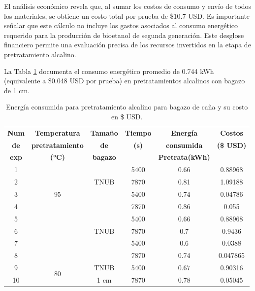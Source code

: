 \documentclass[12pt]{article}
\begin{document}
	El análisis económico revela que, al sumar los costos de consumo y envío de todos los materiales, se obtiene un costo total por prueba de \$10.7 USD. Es importante señalar que este cálculo no incluye los gastos asociados al consumo energético requerido para la producción de bioetanol de segunda generación. Este desglose financiero permite una evaluación precisa de los recursos invertidos en la etapa de pretratamiento alcalino.
	
	La Tabla \ref{tabla costo 1 cm} documenta el consumo energético promedio de 0.744 kWh (equivalente a \$0.048 USD por prueba) en pretratamientos alcalinos con bagazo de 1 cm.
	
	
	
	\begin{table}[H]
		\centering
		\caption{Energía consumida para pretratamiento alcalino para bagazo de caña y su costo en \$ USD. }
		\label{tabla costo 1 cm}
		\setlength{\tabcolsep}{2.5pt}
			\begin{tabular}{|c|c|c|c|c|c|}
				\hline
				\textbf{Num}&\textbf{Temperatura } & \textbf{Tamaño } & \textbf{Tiempo} & \textbf{Energía} & \textbf{Costos } \\ 
			\textbf{ de}	&\textbf{pretratamiento } &	\textbf{ de}  &	\textbf{ (s)} & 	\textbf{ consumida }& 	\textbf{(\$ USD)} \\ 
			\textbf{exp}	&\textbf{(°C)} &	\textbf{ bagazo}  &	 & 	\textbf{ Pretrata(kWh) }& 	 \\ \hline
			
			
			1&	\multirow{5}{*}{95} & \multirow{3}{*}{TNUB} & 5400 &0.66  & 0.88968  \\  \cline{4-6} \cline{1-1}
			2&                     	&                       & 7870 &0.81 & 1.09188  \\ \cline{3-6} \cline{1-1}
			3&                     	& \multirow{3}{*}{1 cm} & 5400 &0.74 & 0.04786  \\  \cline{4-6} \cline{1-1}
			4&                   	&                       & 7870 & 0.86 & 0.055  \\  \hline 
			5&\multirow{5}{*}{90}   & \multirow{3}{*}{TNUB} & 5400 & 0.66  &0.88968  \\  \cline{4-6} \cline{1-1}
			6&                  	&                       & 7870 & 0.7  &  0.9436  \\ 	\cline{3-6} \cline{1-1}
			7&                  	& \multirow{2}{*}{1 cm} & 5400 & 0.6& 0.0388   \\  \cline{4-6} \cline{1-1}
			8&	                    &                       & 7870 & 0.74 & 0.047865\\   \hline
			9&	\multirow{2}{*}{80} & TNUB                  & 5400 &  0.67 & 0.90316  \\  \cline{3-6} \cline{1-1}
			10&	                    & 1 cm                  & 7870 & 0.78 & 0.05045 \\ \hline
		\end{tabular}
		
	\end{table}
	
\end{document}
